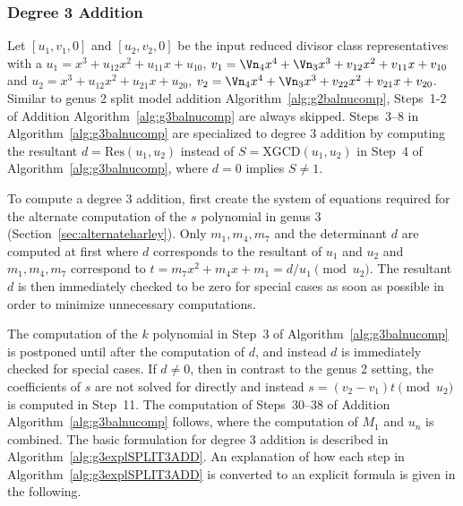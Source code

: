 \subsubsection{Degree 3 Addition}
Let $[u_1,v_1,0]$ and $[u_2,v_2,0]$ be the input reduced divisor class
representatives with a $u_1 = x^3 + u_{12}x^2 + u_{11}x + u_{10}$, $v_1 =
\Vn_4x^4 + \Vn_3x^3 + v_{12}x^2 + v_{11}x + v_{10}$ and $u_2 = x^3 + u_{12}x^2 +
u_{21}x + u_{20}$, $v_2 = \Vn_4x^4 + \Vn_3x^3 + v_{22}x^2 + v_{21}x + v_{20}$.
Similar to genus 2 split model addition Algorithm~\ref{alg:g2balnucomp},
Steps~1-2 of Addition Algorithm~\ref{alg:g3balnucomp} are always skipped.
Steps~3--8 in Algorithm~\ref{alg:g3balnucomp} are specialized to degree 3
addition by computing the resultant $d = \mathrm{Res}(u_1,u_2)$ instead of $S =
\mathrm{XGCD}(u_1,u_2)$ in Step~4 of Algorithm~\ref{alg:g3balnucomp}, where
$d=0$ implies $S \neq 1$. 

To compute a degree 3 addition, first create the system of equations required for the
alternate computation of the $s$ polynomial in genus 3
(Section~\ref{sec:alternateharley}).  Only $m_1,m_4,m_7$ and the determinant $d$ are
computed at first where $d$ corresponds to the resultant of $u_1$ and $u_2$
and $m_1,m_4,m_7$ correspond to $t = m_7x^2 + m_4x + m_1 = d/u_1
\pmod{u_2}$. The resultant $d$ is then immediately checked to be zero for
special cases as soon as possible in order to minimize unnecessary computations.

The computation of the $k$ polynomial in Step~3 of
Algorithm~\ref{alg:g3balnucomp} is postponed until after the computation of $d$,
and instead $d$ is immediately checked for special cases. If $d \neq 0$, then in
contrast to the genus 2 setting, the coefficients of $s$ are not solved for
directly and instead $s = (v_2 - v_1)t \pmod{u_2}$ is computed in Step~11. The
computation of Steps~30--38 of Addition Algorithm~\ref{alg:g3balnucomp} follows,
where  the computation of $M_1$ and $u_n$ is combined. The basic formulation for
degree 3 addition is described in Algorithm~\ref{alg:g3explSPLIT3ADD}. An
explanation of how each step in Algorithm~\ref{alg:g3explSPLIT3ADD} is converted
to an explicit formula is given in the following.

